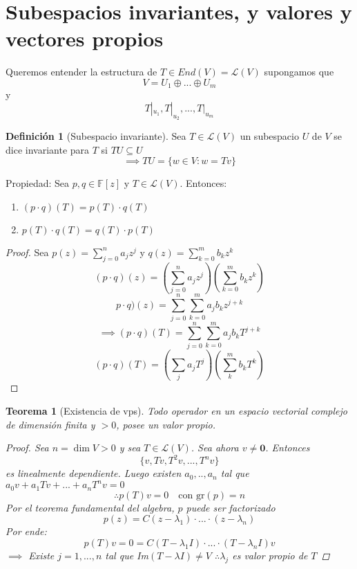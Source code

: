 \documentclass[11pt]{book}
\renewcommand{\vec}[1]{\mathbf{#1}}
\newcommand{\set}[1]{\mathbb{#1}}
\newtheorem{thm}{Teorema}[section]
\theoremstyle{definition}
\newtheorem{defn}{Definición}[section]
\begin{document}
\section{Subespacios invariantes, y valores y vectores propios}
Queremos entender la estructura de $T\in End(V)=\mathcal{L}(V)$ supongamos que
\[V=U_1\oplus...\oplus U_m\]
y
\[T|_{u_1},T|_{u_2},...,T|_{u_m}\]

\begin{defn}[Subespacio invariante]
	Sea $T\in\mathcal{L}(V)$ un subespacio $U$ de $V$ se dice invariante para $T$ si $TU\subseteq U$
	\[\implies TU=\{w\in V:w=Tv\}\]
\end{defn}
Propiedad: Sea $p,q\in\set{F}[z]$ y $T\in\mathcal{L}(V)$. Entonces:
\begin{enumerate}
	\item $(p\cdot q)(T)=p(T)\cdot q(T)$

	\item $p(T)\cdot q(T)=q(T)\cdot p(T)$
\end{enumerate}
\begin{proof}
	Sea $p(z)=\sum^n_{j=0}a_jz^j$ y $q(z)=\sum^m_{k=0}b_kz^k$
	\[(p\cdot q)(z)=\left(\sum^n_{j=0}a_jz^j\right)\left(\sum^m_{k=0}b_kz^k\right)\]
	\[p\cdot q)(z)=\sum^n_{j=0}\sum^m_{k=0}a_jb_kz^{j+k}\]
	\[\implies (p\cdot q)(T)=\sum^n_{j=0}\sum^m_{k=0}a_jb_kT^{j+k}\]
	\[(p\cdot q)(T)=(\sum_ja_jT^j)(\sum^m_kb_kT^k)\]
\end{proof}
\begin{thm}[Existencia de vps]
	Todo operador en un espacio vectorial complejo de dimensión finita y $>0$, posee un valor propio.
	\begin{proof}
		Sea $n=\dim V>0$ y sea $T\in\mathcal{L}(V)$. Sea ahora $v\neq\vec{0}$. Entonces
		\[\{v,Tv,T^2v,...,T^nv\}\]
		es linealmente dependiente. Luego existen $a_0,..,a_n$ tal que $a_0v+a_1Tv+...+a_nT^nv=0$
		\[\therefore p(T)v=0\quad\textrm{con gr$(p)=n$}\]
		Por el teorema fundamental del algebra, $p$ puede ser factorizado
		\[p(z)=C(z-\lambda_1)\cdot...\cdot(z-\lambda_n)\]
		Por ende:
		\[p(T)v=0=C(T-\lambda_1 I)\cdot...\cdot(T-\lambda_n I)v\]
		$\implies$ Existe $j=1,...,n$ tal que Im$(T-\lambda I)\neq V$
		$\therefore\lambda_j$ es valor propio de $T$
	\end{proof}
\end{thm}
\end{document}

